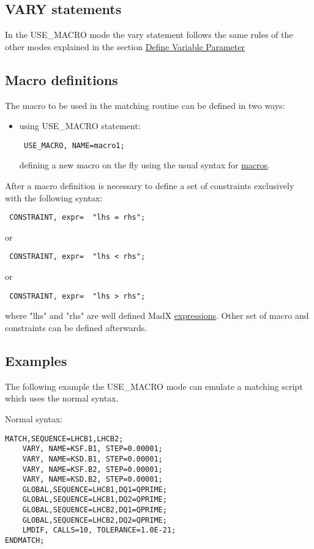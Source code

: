 \subsection{VARY statements}
In the USE\_MACRO mode the vary statement follows the same rules of the
other modes explained in the section \href{match_vary.html}{Define
  Variable Parameter} 

\subsection{Macro definitions}
The macro to be used in the matching routine can be defined in two ways:
 
\begin{itemize}
   \item using USE\_MACRO statement:
\begin{verbatim}
 USE_MACRO, NAME=macro1;
\end{verbatim}
defining a new macro on the fly using the usual syntax for
\href{../control/special.html#macro}{ macros}.  
\end{itemize}
 
After a macro definition is necessary to define a set of constraints exclusively with the following syntax:
 
\begin{verbatim}
 CONSTRAINT, expr=  "lhs = rhs"; 
\end{verbatim}
or 
\begin{verbatim}
 CONSTRAINT, expr=  "lhs < rhs"; 
\end{verbatim}
or
\begin{verbatim}
 CONSTRAINT, expr=  "lhs > rhs"; 
\end{verbatim}

where "lhs" and "rhs" are well defined MadX
\href{../Introduction/expression.html}{expressions}. Other set of macro
and constraints can be defined afterwards. 

\subsection{Examples}
The following example the USE\_MACRO mode can emulate a matching script
which uses the normal syntax. 

Normal syntax:

\begin{verbatim}
MATCH,SEQUENCE=LHCB1,LHCB2;
    VARY, NAME=KSF.B1, STEP=0.00001;
    VARY, NAME=KSD.B1, STEP=0.00001;
    VARY, NAME=KSF.B2, STEP=0.00001;
    VARY, NAME=KSD.B2, STEP=0.00001;
    GLOBAL,SEQUENCE=LHCB1,DQ1=QPRIME;
    GLOBAL,SEQUENCE=LHCB1,DQ2=QPRIME;
    GLOBAL,SEQUENCE=LHCB2,DQ1=QPRIME;
    GLOBAL,SEQUENCE=LHCB2,DQ2=QPRIME;
    LMDIF, CALLS=10, TOLERANCE=1.0E-21;
ENDMATCH;
\end{verbatim}

